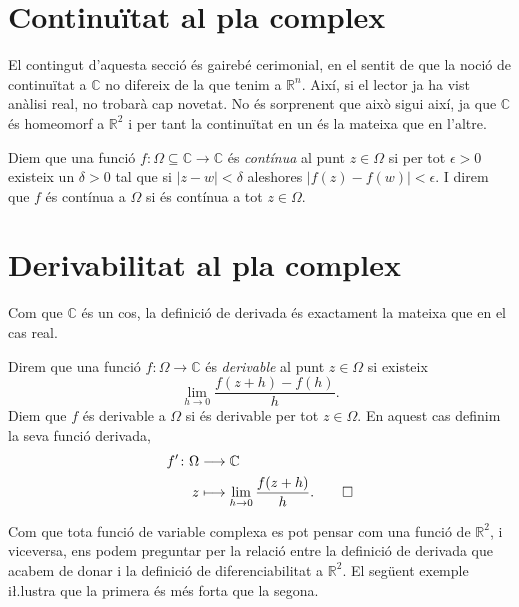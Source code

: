 \documentclass[12pt,twoside]{report}
\numberwithin{table}{section}
\numberwithin{equation}{section}
\numberwithin{figure}{section}
\newcommand{\R}{\ensuremath{\mathbb{R}}}
\newcommand{\C}{\ensuremath{\mathbb{C}}}
\newcommand{\abs}[1]{\left\lvert #1 \right\rvert}
\begin{document}
\section{Continuïtat al pla complex}
El contingut d'aquesta secció és gairebé cerimonial, en el sentit de que la noció de continuïtat a \( \C \) no difereix de la que tenim a \( \R^n \). Així, si el lector ja ha vist anàlisi real, no trobarà cap novetat. No és sorprenent que això sigui així, ja que \( \C \) és homeomorf a \( \R^2 \) i per tant la continuïtat en un és la mateixa que en l'altre. 

\begin{defn}[Continuïtat]
	Diem que una funció \( f \colon \Omega \subseteq \C \to \C \) és \emph{contínua} al punt \( z \in \Omega \) si per tot \( \epsilon > 0 \) existeix un \( \delta > 0 \) tal que si \( \abs{z - w} < \delta \) aleshores \( \abs{f(z) - f(w)} < \epsilon \). I direm que \( f \) és contínua a \( \Omega \) si és contínua a tot \( z \in \Omega \). 
\end{defn}

\section{Derivabilitat al pla complex}
Com que \( \C \) és un cos, la definició de derivada és exactament la mateixa que en el cas real. 
\begin{defn}\label{def:funcio holomorfa}
	Direm que una funció \( f \colon \Omega \to \C \) és \emph{derivable} al punt \( z \in \Omega \) si existeix
	\begin{equation*}
		\lim_{h \to 0}{\frac{f(z + h) - f(h)}{h}}.
	\end{equation*}
	Diem que \( f \) és derivable a \( \Omega \) si és derivable per tot \( z \in \Omega \). En aquest cas definim la seva funció derivada,
	\begin{align*}
		f' \colon \Omega & \longrightarrow \C \\
		z & \longmapsto \lim_{h \to 0}{\frac{f(z + h)}{h}}. \qedhere
	\end{align*}
\end{defn}
Com que tota funció de variable complexa es pot pensar com una funció de \( \R^2 \), i viceversa, ens podem preguntar per la relació entre la definició de derivada que acabem de donar i la definició de diferenciabilitat a \( \R^2 \). El següent exemple i\l.lustra que la primera és més forta que la segona.
\end{document}
